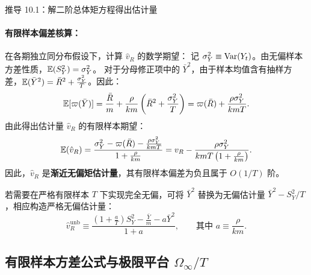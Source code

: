 \begin{derivationbox}{推导 10.1：解二阶总体矩方程得出估计量}
\paragraph{有限样本偏差核算：}
在各期独立同分布假设下，计算 $\hat{v}_R$ 的数学期望：
记 $\sigma_Y^2 \equiv \mathrm{Var}(Y_t)$。由无偏样本方差性质，$\mathbb{E}(S_Y^2) = \sigma_Y^2$。
对于分母修正项中的 $\bar{Y}^2$，由于样本均值含有抽样方差，$\mathbb{E}(\bar{Y}^2) = \bar{R}^2 + \frac{\sigma_Y^2}{T}$。因此：
\begin{equation}
  \mathbb{E}[\varpi(\bar{Y})] = \frac{\bar{R}}{m} + \frac{\rho}{km}\left(\bar{R}^2 + \frac{\sigma_Y^2}{T}\right) = \varpi(\bar{R}) + \frac{\rho \sigma_Y^2}{kmT}.
\end{equation}
由此得出估计量 $\hat{v}_R$ 的有限样本期望：
\begin{equation}
  \mathbb{E}(\hat{v}_R) = \frac{\sigma_Y^2 - \varpi(\bar{R}) - \frac{\rho \sigma_Y^2}{kmT}}{1 + \frac{\rho}{km}} = v_R - \frac{\rho \sigma_Y^2}{kmT\left(1 + \frac{\rho}{km}\right)}.
\end{equation}
因此，$\hat{v}_R$ 是\textbf{渐近无偏矩估计量}，其有限样本偏差为负且属于 $O(1/T)$ 阶。

若需要在严格有限样本 $T$ 下实现完全无偏，可将 $\bar{Y}^2$ 替换为无偏估计量 $\bar{Y}^2 - S_Y^2/T$，相应构造严格无偏估计量：
\begin{equation}
  \hat{v}_R^{\mathrm{unb}} \equiv \frac{\left(1 + \frac{a}{T}\right)S_Y^2 - \frac{\bar{Y}}{m} - a \bar{Y}^2}{1 + a}, \qquad \text{其中 } a \equiv \frac{\rho}{km}.
\end{equation}
\end{derivationbox}

\subsection{有限样本方差公式与极限平台 $\Omega_\infty / T$}

